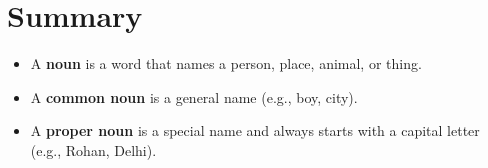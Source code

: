 \section{Summary}
\begin{summarybox}
    \begin{itemize}
        \item A \textbf{noun} is a word that names a person, place, animal, or thing.
        \item A \textbf{common noun} is a general name (e.g., boy, city).
        \item A \textbf{proper noun} is a special name and always starts with a capital letter (e.g., Rohan, Delhi).
    \end{itemize}
\end{summarybox}